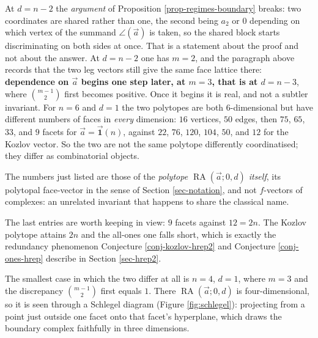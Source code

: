 \documentclass[11pt, a4paper, abstract=yes]{scrartcl}
\theoremstyle{definition}
\theoremstyle{remark}
\theoremstyle{plain}
\newcommand{\rasimp}{\angle}
\newcommand{\RA}{\operatorname{RA}}
\newcommand{\onesvec}{\vec{\mathbf 1}}
\begin{document}
At \(d=n-2\) the \emph{argument} of Proposition \ref{prop-regimes-boundary} breaks: two coordinates are
shared rather than one, the second being \(a_2\) or \(0\) depending on which vertex of the summand
\(\rasimp(\vec a)\) is taken, so the shared
block starts discriminating on both sides at once. That is a statement about the proof and not about
the answer. At \(d=n-2\) one has \(m=2\), and the paragraph above records that the two leg vectors
still give the same face lattice there: \textbf{dependence on \(\vec a\) begins one step later, at
\(m=3\), that is at \(d=n-3\)}, where \(\binom{m-1}{2}\) first becomes positive. Once it begins
it is real, and not a subtler invariant. For \(n=6\) and \(d=1\) the two polytopes are both \(6\)-dimensional but have
different numbers of faces in \emph{every} dimension: \(16\) vertices, \(50\) edges, then \(75\), \(65\),
\(33\), and \(9\) facets for \(\vec a=\onesvec(n)\), against \(22\), \(76\), \(120\), \(104\), \(50\),
and \(12\) for the Kozlov vector. So the two are not the same polytope differently coordinatised;
they differ as combinatorial objects.

The numbers just listed are those of the \emph{polytope \(\RA(\vec a;0,d)\) itself}, its polytopal
face-vector in the sense of Section \ref{sec-notation}, and not \(f\)-vectors of complexes: an
unrelated invariant that happens to share the classical name.

The last entries are worth keeping in view: \(9\) facets against \(12=2n\). The Kozlov polytope
attains \(2n\) and the all-ones one falls short, which is exactly the redundancy phenomenon
Conjecture \ref{conj-kozlov-hrep2} and Conjecture \ref{conj-ones-hrep} describe in Section \ref{sec-hrep2}.

The smallest case in which the two differ at all is \(n=4\), \(d=1\), where \(m=3\) and the
discrepancy \(\binom{m-1}{2}\) first equals \(1\). There \(\RA(\vec a;0,d)\) is four-dimensional,
so it is seen
through a Schlegel diagram (Figure \ref{fig:schlegel}): projecting from a point just outside one
facet onto that facet's hyperplane, which draws the boundary complex faithfully in three dimensions.
\end{document}
